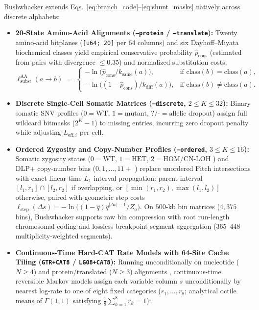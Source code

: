 \documentclass[12pt]{article}
\begin{document}
Bushwhacker extends Eqs.~\eqref{eq:branch_code}--\eqref{eq:shunt_masks} natively across discrete alphabets:
\begin{itemize}
    \item \textbf{20-State Amino-Acid Alignments (\texttt{--protein} / \texttt{--translate}):} Twenty amino-acid bitplanes (\texttt{[u64; 20]} per 64 columns) and six Dayhoff--Miyata biochemical classes \cite{dayhoff1978model} yield empirical conservative probability $\hat{p}_{\text{cons}}$ (estimated from pairs with divergence $\le 0.35$) and normalized substitution costs:
    \begin{equation}
        \ell_{\text{subst}}^{\text{AA}}(a \to b) \;=\;
        \begin{cases}
            -\ln\!\big(\hat{p}_{\text{cons}} / k_{\text{same}}(a)\big), & \text{if } \text{class}(b) = \text{class}(a), \\[2pt]
            -\ln\!\big((1 - \hat{p}_{\text{cons}}) / k_{\text{diff}}(a)\big), & \text{if } \text{class}(b) \neq \text{class}(a).
        \end{cases}
        \label{eq:aa_subst}
    \end{equation}
    \item \textbf{Discrete Single-Cell Somatic Matrices (\texttt{--discrete}, $2 \le K \le 32$):} Binary somatic SNV profiles ($0 = \text{WT}$, $1 = \text{mutant}$, $?/\texttt{-} = \text{allelic dropout}$) assign full wildcard bitmasks ($2^K - 1$) to missing entries, incurring zero dropout penalty while adjusting $L_{\text{eff}, i}$ per cell.
    \item \textbf{Ordered Zygosity and Copy-Number Profiles (\texttt{--ordered}, $3 \le K \le 16$):} Somatic zygosity states ($0 = \text{WT}$, $1 = \text{HET}$, $2 = \text{HOM/CN-LOH}$ \cite{morita2020clonal,sollier2023compass}) and DLP+ copy-number bins ($0, 1, \dots, 11+$ \cite{salehi2023sitka}) replace unordered Fitch intersections with exact linear-time $L_1$ interval propagation: parent interval $[l_1,r_1] \cap [l_2,r_2]$ if overlapping, or $[\min(r_1,r_2), \max(l_1,l_2)]$ otherwise, paired with geometric step costs $\ell_{\text{step}}(\Delta s) = -\ln\big((1-\hat{q})\hat{q}^{|\Delta s|-1}/Z_a\big)$. On $500\text{-kb}$ bin matrices ($4,375$ bins), Bushwhacker supports raw bin compression with root run-length chromosomal coding and lossless breakpoint-segment aggregation ($365\text{--}448$ multiplicity-weighted segments).
    \item \textbf{Continuous-Time Hard-CAT Rate Models with 64-Site Cache Tiling (\texttt{GTR+CAT8} / \texttt{LG08+CAT8}):} Running unconditionally on nucleotide ($N \ge 4$) and protein/translated ($N \ge 3$) alignments \cite{tavare1986some,yang1994maximum,le2008improved}, continuous-time reversible Markov models assign each variable column $s$ unconditionally by nearest log-rate to one of eight fixed categories ($r_1, \dots, r_8$; analytical octile means of $\Gamma(1,1)$ satisfying $\frac{1}{8}\sum_{k=1}^8 r_k = 1$):

\end{itemize}
\end{document}

